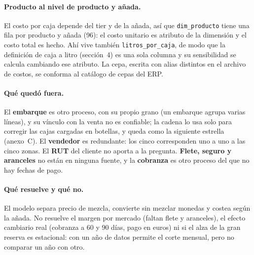 \paragraph{Producto al nivel de producto y añada.} El costo por caja depende del tier y de la añada, así que \texttt{dim\_producto} tiene una fila por producto y añada (96): el costo unitario es atributo de la dimensión y el costo total es hecho. Ahí vive también \texttt{litros\_por\_caja}, de modo que la definición de caja a litro (sección~4) es una sola columna y su sensibilidad se calcula cambiando ese atributo. La cepa, escrita con alias distintos en el archivo de costos, se conforma al catálogo de cepas del ERP.

\paragraph{Qué quedó fuera.}

El \textbf{embarque} es otro proceso, con su propio grano (un embarque agrupa varias líneas), y su vínculo con la venta no es confiable; la cadena lo usa solo para corregir las cajas cargadas en botellas, y queda como la siguiente estrella (anexo~C). El \textbf{vendedor} es redundante: los cinco corresponden uno a uno a las cinco zonas. El \textbf{RUT} del cliente no aporta a la pregunta. \textbf{Flete, seguro y aranceles} no están en ninguna fuente, y la \textbf{cobranza} es otro proceso del que no hay fechas de pago.

\paragraph{Qué resuelve y qué no.} El modelo separa precio de mezcla, convierte sin mezclar monedas y costea según la añada. No resuelve el margen por mercado (faltan flete y aranceles), el efecto cambiario real (cobranza a 60 y 90 días, pago en euros) ni si el alza de la gran reserva es estacional: con un año de datos permite el corte mensual, pero no comparar un año con otro.
